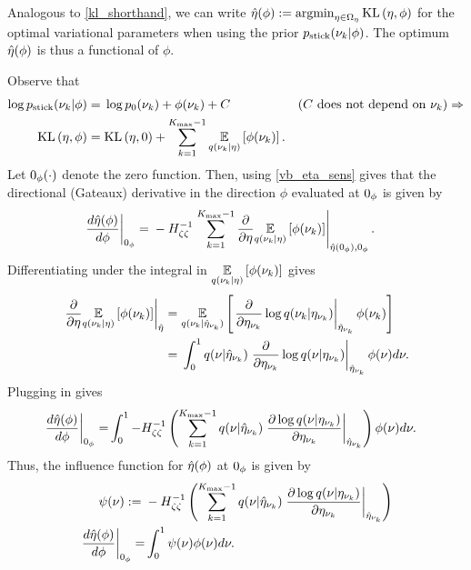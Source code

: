 Analogous to \eqref{kl_shorthand}, we can write $\hat\eta(\phi) := \operatorname*{\mathrm{argmin}}_{\eta
\in \Omega_{\eta}} \mathrm{KL}\left(\eta, \phi\right)$ for the optimal variational parameters when
using the prior $p_{\mathrm{stick}}(\nu_{k} \vert \phi)$.  The optimum $\hat\eta(\phi)$
is thus a functional of $\phi$.

Observe that
%
\begin{align*}
%
\log \pstick(\nuk \vert \phi) ={}&
    \log \pb(\nuk) + \phi(\nuk) + \const
    & \constdesc{\nuk} \Rightarrow\\
\KL{\eta, \phi} ={}&
    \KL{\eta, 0} + \sumkm \expect{\q(\nuk \vert \eta)}{\phi(\nuk)}.
%
\end{align*}
%
Let $0_\phi(\cdot)$ denote the zero function.  Then, using \eqref{vb_eta_sens}
gives that the directional (Gateaux) derivative in the direction $\phi$
evaluated at $0_\phi$ is given by
%
\begin{align*}
%
\fracat{d \etaopt(\phi)}{d \phi}{\phiz} ={}&
    - \hess{\zeta\zeta}^{-1}
    \evalat{
        \sumkm \frac{\partial}{\partial \eta}
            \expect{\q(\nuk \vert \eta)}{\phi(\nuk)}}
           {\etaopt(\phiz), \phiz}.
%
\end{align*}
%
Differentiating under the integral in $\underset{q(\nu_{k} \vert
\eta)}{\mathbb{E}}\left[\phi(\nu_{k})\right]$ gives
%
\begin{align*}
%
\evalat{
\frac{\partial}{\partial \eta}
    \expect{\q(\nuk \vert \eta)}{\phi(\nuk)}
}{\etaopt} ={}&
\expect{\q(\nuk \vert \etaoptnuk)}
       {\evalat{\frac{\partial}{\partial \etanuk}
                  \log\q(\nuk \vert \etanuk)}
                {\etaoptnuk}
        \phi(\nuk)} \\
={}&
\int_0^1
    \q(\nu \vert \etaoptnuk)
    \evalat{\frac{\partial}{\partial \etanuk}
               \log\q(\nu \vert \etanuk)}
             {\etaoptnuk}
    \phi(\nu) d\nu.
%
\end{align*}
%
Plugging in gives
%
\begin{align*}
%
\fracat{d \etaopt(\phi)}{d \phi}{\phiz} =&{}
    \int_0^1
    -\hess{\zeta\zeta}^{-1}
    \left(
        \sumkm
        \q(\nu \vert \etaoptnuk)
        \fracat{\partial \log\q(\nu \vert \etanuk)}
               {\partial \etanuk}
               {\etaoptnuk}
    \right) \phi(\nu) d\nu.
%
\end{align*}
%
Thus, the influence function for $\hat\eta(\phi)$ at $0_\phi$ is given by
%
\begin{align*}
%
\infl(\nu) :={}&
-\hess{\zeta\zeta}^{-1}
\left(
    \sumkm
    \q(\nu \vert \etaoptnuk)
    \fracat{\partial \log\q(\nu \vert \etanuk)}
           {\partial \etanuk}
           {\etaoptnuk}
\right) \\
\fracat{d \etaopt(\phi)}{d \phi}{\phiz} =&{}
    \int_0^1 \infl(\nu) \phi(\nu) d\nu.
%
\end{align*}

